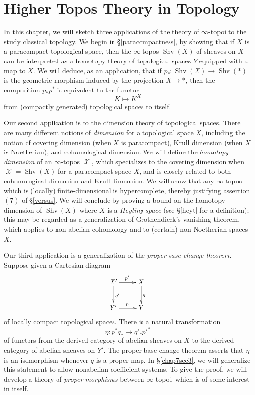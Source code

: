 \documentclass{report}[10pt, final]
\DeclareMathOperator{\Shv}{Shv}
\DeclareMathOperator{\calX}{\mathcal{X}}
\theoremstyle{definition}
\begin{document}






\chapter{Higher Topos Theory in Topology}\label{chap7}

\setcounter{theorem}{0}
\setcounter{subsection}{0}


In this chapter, we will sketch three applications of the theory of $\infty$-topoi to the study classical topology. We begin in \S \ref{paracompactness}, by showing that if $X$ is a paracompact topological space, then the $\infty$-topos $\Shv(X)$ of sheaves on $X$ can be interpreted as a homotopy theory of topological spaces $Y$ equipped with a map to $X$. We will deduce, as an application, that if $p_{\ast}: \Shv(X) \rightarrow \Shv(\ast)$ is the geometric morphism induced by the projection $X \rightarrow \ast$, then the composition $p_{\ast} p^{\ast}$ is equivalent to the functor $$K \mapsto K^X$$ from (compactly generated) topological spaces to itself.

Our  second application is to the dimension theory of topological spaces. There are many different notions of {\it dimension} for a topological space $X$, including the notion of covering dimension (when $X$ is paracompact), Krull dimension (when $X$ is Noetherian), and cohomological dimension. We will define the {\it homotopy dimension} of an $\infty$-topos $\calX$, which specializes to the covering dimension when $\calX = \Shv(X)$ for a paracompact space $X$, and is closely related to both cohomological dimension and Krull dimension. We will show that any $\infty$-topos which is (locally) finite-dimensional is hypercomplete, thereby justifying assertion $(7)$ of \S \ref{versus}. We will conclude by proving a bound on the homotopy dimension of $\Shv(X)$ where $X$ is a {\it Heyting space} (see \S \ref{heyt} for a definition); this may be regarded as a generalization of Grothendieck's vanishing theorem, which applies to non-abelian cohomology and to (certain) non-Noetherian spaces $X$.

Our third application is a generalization of the {\em proper base change theorem.}
Suppose given a Cartesian diagram
$$ \xymatrix{ X' \ar[r]^{p'} \ar[d]^{q'} & X \ar[d]^{q} \\
Y' \ar[r]^{p} & Y}$$
of locally compact topological spaces.
There is a natural transformation
$$ \eta: p^{\ast} q_{\ast} \rightarrow q'_{\ast} {p'}^{\ast}$$
of functors from the derived category of abelian sheaves on $X$ to the derived category of abelian sheaves on $Y'$. The proper base change theorem asserts that $\eta$ is an isomorphism whenever $q$ is a proper map. In \S \ref{chap7sec3}, we will generalize this statement to allow nonabelian coefficient systems. To give the proof, we will develop a theory of {\it proper morphisms} between $\infty$-topoi, which is of some interest in itself.
\end{document}
